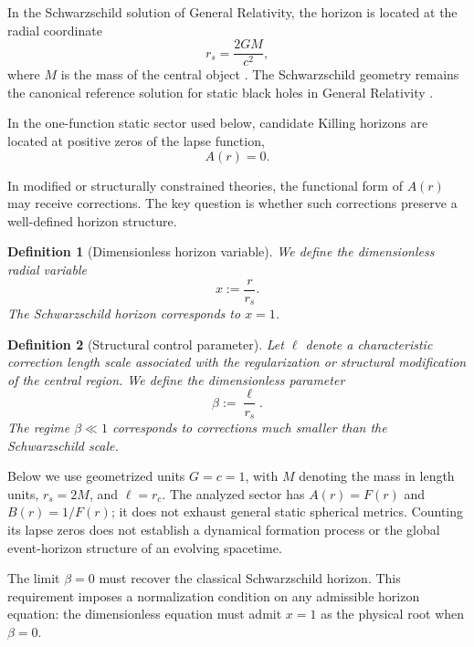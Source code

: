 \documentclass[11pt,a4paper]{article}
\newtheorem{definition}{Definition}
\begin{document}
In the Schwarzschild solution of General Relativity, the horizon is located at
the radial coordinate
\begin{equation}
r_s = \frac{2GM}{c^2},
\label{eq:schwarzschild_radius}
\end{equation}
where \(M\) is the mass of the central object \cite{schwarzschild1916}. The
Schwarzschild geometry remains the canonical reference solution for static black
holes in General Relativity \cite{wald1984,chandrasekhar1983}.

In the one-function static sector used below, candidate Killing horizons are
located at positive zeros of the lapse function,
\begin{equation}
A(r)=0.
\label{eq:horizon_condition}
\end{equation}

In modified or structurally constrained theories, the functional form of
\(A(r)\) may receive corrections. The key question is whether such corrections
preserve a well-defined horizon structure.

\begin{definition}[Dimensionless horizon variable]
We define the dimensionless radial variable
\begin{equation}
x := \frac{r}{r_s}.
\label{eq:x_definition}
\end{equation}
The Schwarzschild horizon corresponds to \(x=1\).
\end{definition}

\begin{definition}[Structural control parameter]
Let \(\ell\) denote a characteristic correction length scale associated with the
regularization or structural modification of the central region. We define the
dimensionless parameter
\begin{equation}
\beta := \frac{\ell}{r_s}.
\label{eq:beta_definition}
\end{equation}
The regime \(\beta \ll 1\) corresponds to corrections much smaller than the
Schwarzschild scale.
\end{definition}

Below we use geometrized units \(G=c=1\), with \(M\) denoting the mass in
length units, \(r_s=2M\), and \(\ell=r_c\). The analyzed sector has
\(A(r)=F(r)\) and \(B(r)=1/F(r)\); it does not exhaust general static spherical
metrics. Counting its lapse zeros does not establish a dynamical formation
process or the global event-horizon structure of an evolving spacetime.

The limit \(\beta=0\) must recover the classical Schwarzschild horizon. This
requirement imposes a normalization condition on any admissible horizon
equation: the dimensionless equation must admit \(x=1\) as the physical root
when \(\beta=0\).
\end{document}
